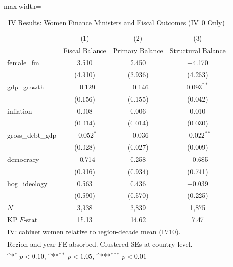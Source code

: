 \begin{table}[htbp]\centering
\def\sym#1{\ifmmode^{#1}\else\(^{#1}\)\fi}
\caption{IV Results: Women Finance Ministers and Fiscal Outcomes (IV10 Only)}
\label{tab:iv_main}
\begin{adjustbox}{max width=\textwidth}
\small
\begin{tabular}{l*{3}{c}}
\hline\hline
            &\multicolumn{1}{c}{(1)}&\multicolumn{1}{c}{(2)}&\multicolumn{1}{c}{(3)}\\
            &\multicolumn{1}{c}{Fiscal Balance}&\multicolumn{1}{c}{Primary Balance}&\multicolumn{1}{c}{Structural Balance}\\
\hline
female\_fm   & 3.510 & 2.450 & $-$4.170 \\
            & (4.910) & (3.936) & (4.253) \\[0.5em]
gdp\_growth  & $-$0.129 & $-$0.146 & $0.093^{**}$ \\
            & (0.156) & (0.155) & (0.042) \\[0.5em]
inflation   & 0.008 & 0.006 & 0.010 \\
            & (0.014) & (0.014) & (0.030) \\[0.5em]
gross\_debt\_gdp & $-0.052^{*}$ & $-$0.036 & $-0.022^{**}$ \\
            & (0.028) & (0.027) & (0.009) \\[0.5em]
democracy   & $-$0.714 & 0.258 & $-$0.685 \\
            & (0.916) & (0.934) & (0.741) \\[0.5em]
hog\_ideology & 0.563 & 0.436 & $-$0.039 \\
            & (0.590) & (0.570) & (0.225) \\
\hline
\(N\)       & 3,938 & 3,839 & 1,875 \\
KP $F$-stat & 15.13 & 14.62 & 7.47 \\
\hline\hline
\multicolumn{4}{l}{\footnotesize IV: cabinet women relative to region-decade mean (IV10).}\\
\multicolumn{4}{l}{\footnotesize Region and year FE absorbed. Clustered SEs at country level.}\\
\multicolumn{4}{l}{\footnotesize \sym{*} \(p<0.10\), \sym{**} \(p<0.05\), \sym{***} \(p<0.01\)}\\
\end{tabular}
\end{adjustbox}
\end{table}
